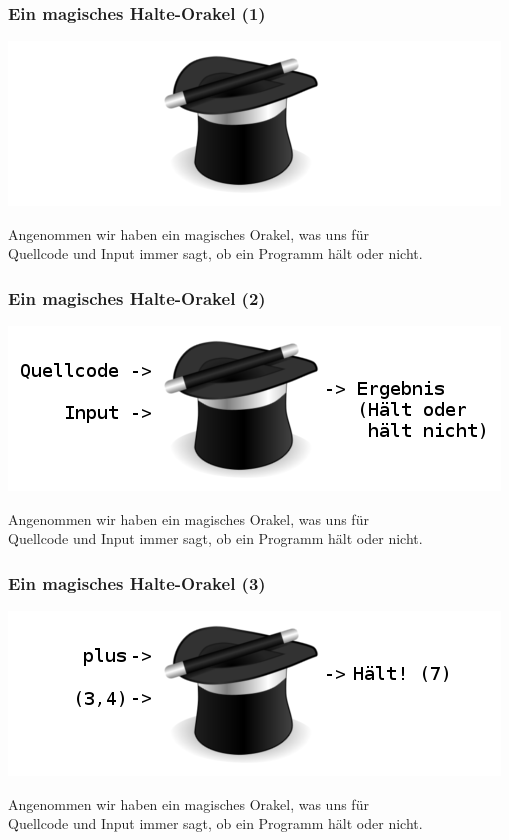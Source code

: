 \documentclass[aspectratio=169]{beamer}
\begin{document}
\begin{frame}
\frametitle{Ein magisches Halte-Orakel (1)}
\begin{center}
\includegraphics[scale=1.4]{images/hat_alone.png}
\bigskip

Angenommen wir haben ein magisches Orakel, was uns für\\Quellcode und Input immer sagt, ob ein Programm hält oder nicht.
\end{center}
\end{frame}


\begin{frame}
\frametitle{Ein magisches Halte-Orakel (2)}
\begin{center}
\includegraphics[scale=1.4]{images/erklaerung01.png} 
\bigskip

Angenommen wir haben ein magisches Orakel, was uns für\\Quellcode und Input immer sagt, ob ein Programm hält oder nicht.
\end{center}
\end{frame}


\begin{frame}
\frametitle{Ein magisches Halte-Orakel (3)}
\begin{center}
\includegraphics[scale=1.4]{images/erklaerung02.png} 
\bigskip

Angenommen wir haben ein magisches Orakel, was uns für\\Quellcode und Input immer sagt, ob ein Programm hält oder nicht.
\end{center}
\end{frame}
\end{document}
